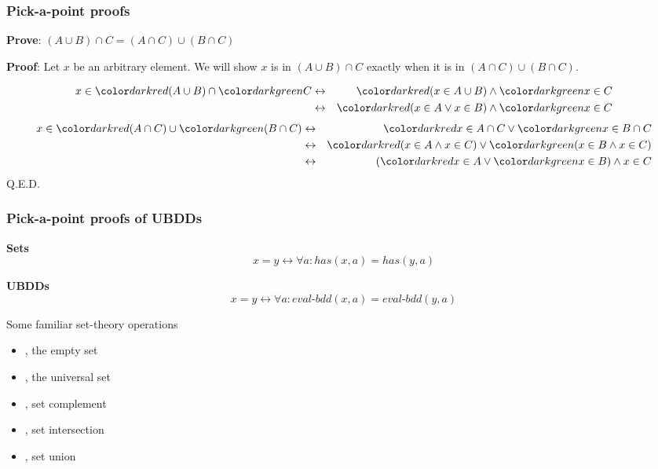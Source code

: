 \begin{frame}
\frametitle{Pick-a-point proofs}

{\bf Prove}: $(A \cup B) \cap C = (A \cap C) \cup (B \cap C)$

\SmallSkip
{\bf Proof}: Let $x$ be an arbitrary element.  We will show $x$ is in $(A \cup B)
\cap C$ exactly when it is in $(A \cap C) \cup (B \cap C)$.

\begin{eqnarray*}
x \in \Red{(A \cup B)} \cap \Green{C}
  &\leftrightarrow& \Red{(x \in A \cup B)} \wedge \Green{x \in C} \\
  &\leftrightarrow& \Red{(x \in A \vee x \in B)} \wedge \Green{x \in C}
\end{eqnarray*}
\begin{eqnarray*}
x \in \Red{(A \cap C)} \cup \Green{(B \cap C)}
  &\leftrightarrow& \Red{x \in A \cap C} \vee \Green{x \in B \cap C} \\
  &\leftrightarrow& \Red{(x \in A \wedge x \in C)} \vee \Green{(x \in B \wedge x \in C)} \\
  &\leftrightarrow& (\Red{x \in A} \vee \Green{x \in B}) \wedge x \in C
\end{eqnarray*}
Q.E.D.
\end{frame}


\begin{frame}
\frametitle{Pick-a-point proofs of UBDDs}

{\bf Sets} \[x = y \leftrightarrow \forall a : \mathit{has}(x, a) = \mathit{has}(y, a)\]

\SmallSkip
{\bf UBDDs} \[x = y \leftrightarrow \forall a : \mathit{eval\textrm{-}bdd}(x,
a) = \mathit{eval\textrm{-}bdd}(y, a)\]

\SmallSkip
Some familiar set-theory operations
\begin{itemize}
\item {}, the empty set
\item {}, the universal set
\item {}, set complement
\item {}, set intersection
\item {}, set union
\end{itemize}
\end{frame}




